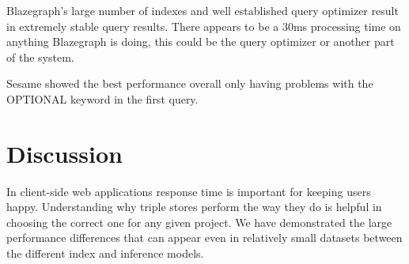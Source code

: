 \documentclass{llncs}
\begin{document}
Blazegraph's large number of indexes and well established query optimizer result in extremely stable query results.  There appears to be a 30ms processing time on anything Blazegraph is doing, this could be the query optimizer or another part of the system. 

Sesame showed the best performance overall only having problems with the OPTIONAL keyword in the first query.

\section{Discussion}
In client-side web applications response time is important for keeping users happy.  Understanding why triple stores perform the way they do is helpful in choosing the correct one for any given project.  We have demonstrated the large performance differences that can appear even in relatively small datasets between the different index and inference models.



\end{document}

